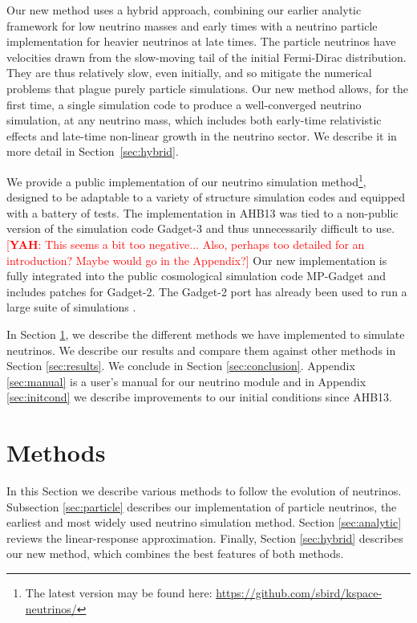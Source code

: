 \documentclass[useAMS, usenatbib]{mnras}
\newcommand{\yah}[1]{{\textcolor{red}{[{\bf YAH}: #1]}}}
\begin{document}
Our new method uses a hybrid approach, combining our earlier analytic framework for low neutrino masses and early times with a neutrino particle implementation for
heavier neutrinos at late times. The particle neutrinos have velocities drawn from the slow-moving tail of the initial Fermi-Dirac distribution. They are thus relatively slow,
even initially, and so mitigate the numerical problems that plague purely particle simulations. Our new method allows, for the first time, a single simulation code to produce a well-converged neutrino simulation, at any neutrino mass, which includes both early-time relativistic effects and late-time non-linear growth in the neutrino sector. We describe it in more detail in Section~\ref{sec:hybrid}.

We provide a public implementation of our neutrino simulation method\footnote{The latest version may be found here: \url{https://github.com/sbird/kspace-neutrinos/}},
designed to be adaptable to a variety of structure simulation codes and equipped with a battery of tests.
The implementation in AHB13 was tied to a non-public version of the simulation code Gadget-3 \citep{Springel_2005} and thus unnecessarily difficult to use. \yah{This seems a bit too negative... Also, perhaps too detailed for an introduction? Maybe would go in the Appendix?}
Our new implementation is fully integrated into the public cosmological simulation code MP-Gadget \citep{Feng_2016} and includes patches for Gadget-2.
The Gadget-2 port has already been used to run a large suite of simulations \citep{Liu_2017}.

In Section \ref{sec:methods}, we describe the different methods we have implemented to simulate neutrinos. We describe our
results and compare them against other methods in Section \ref{sec:results}. We conclude in Section \ref{sec:conclusion}. Appendix \ref{sec:manual} is a user's manual for our neutrino module and in Appendix \ref{sec:initcond} we describe improvements to our initial conditions since AHB13.

\section{Methods}
\label{sec:methods}

In this Section we describe various methods to follow the evolution of neutrinos. Subsection \ref{sec:particle} describes our implementation of particle neutrinos, the earliest and most widely used neutrino simulation method. Section \ref{sec:analytic} reviews the linear-response approximation. 
Finally, Section \ref{sec:hybrid} describes our new method, which combines the best features of both methods. 
\end{document}
